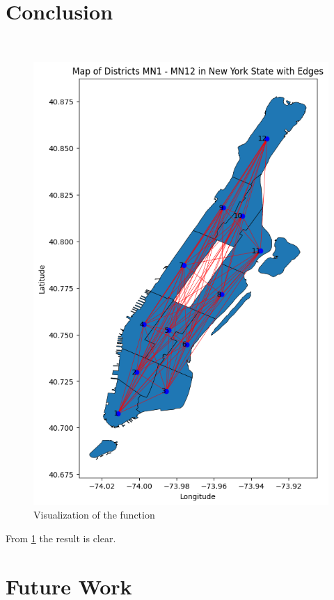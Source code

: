 \documentclass[20pt]{article}
\theoremstyle{definition}
\begin{document}
\section  {Conclusion} \ 

\begin{figure}[h]
	\centering
	\includegraphics[width=1\textwidth]{figures/graph.png}
	\caption{Visualization of the function}
	\label{fig:sinexp}
\end{figure}

From \cref{fig:sinexp} the result is clear.

\section  {Future Work} \ 
\end{document}
